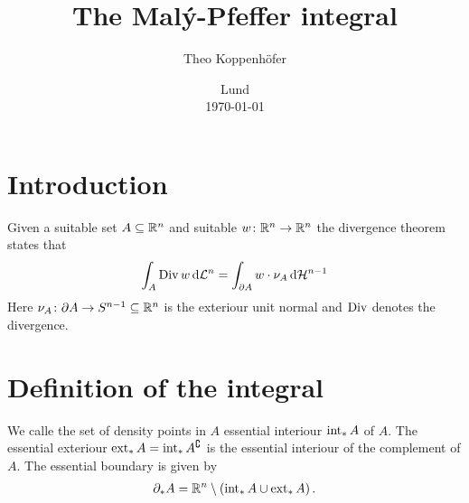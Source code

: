 %




\subject{Specialised course in integration theory, VT23}
\title{The Malý-Pfeffer integral}
\author{Theo Koppenhöfer}
\date{Lund \\[1ex] \today}










\frame[plain]{\titlepage}


\section{Introduction}
\begin{frame}
	Given a suitable set $A\subseteq\mathbb{R}^n$ and suitable $w\colon\mathbb{R}^n\to\mathbb{R}^n$ the divergence theorem states that
	\begin{align*}
		\int_A\operatorname{Div} w\,\mathrm{d} \mathcal{L}^n=\int_{\partial A}w\cdot\nu_A\,\mathrm{d} \mathcal{H}^{n-1}
	\end{align*}
	Here $\nu_A\colon \partial A\to S^{n-1}\subseteq\mathbb{R}^n$ is the exteriour unit normal and $\operatorname{Div}$ denotes the divergence.
\end{frame}

\section{Definition of the integral}

\begin{frame}
	\begin{definition}
	We calle the set of density points in $A$ essential interiour $\operatorname{int}_*A$ of $A$.
	The essential exteriour $\operatorname{ext}_*A=\operatorname{int}_*A^\complement$ is the essential interiour of the complement of $A$. The essential boundary is given by
	\begin{align*}
		\partial_*A=\mathbb{R}^n\setminus(\operatorname{int}_*A\cup\operatorname{ext}_*A)\,.
	\end{align*}
	\end{definition}
\end{frame}

